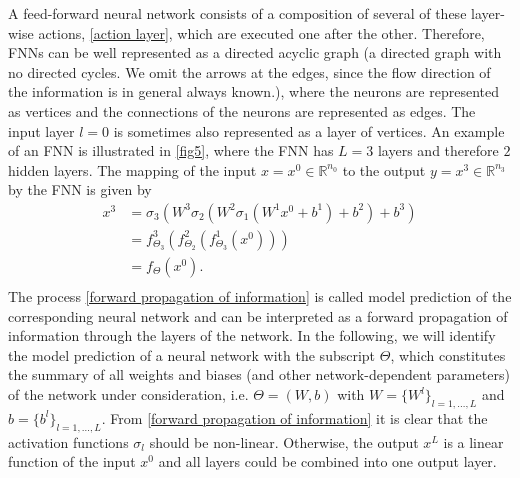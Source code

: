 A feed-forward neural network consists of a composition of several of these layer-wise actions, \cref{action layer}, which are executed one after the other. Therefore, FNNs can be well represented as a directed acyclic graph (a directed graph with no directed cycles. We omit the arrows at the edges, since the flow direction of the information is in general always known.), where the neurons are represented as vertices and the connections of the neurons are represented as edges. The input layer $l=0$ is sometimes also represented as a layer of vertices. An example of an FNN is illustrated in \cref{fig5}, where the FNN has $L=3$ layers and therefore $2$ hidden layers. The mapping of the input $x = x^0 \in \mathbb{R}^{n_0}$ to the output $y = x^3 \in \mathbb{R}^{n_3}$ by the FNN is given by 
\begin{equation}
    \label{forward propagation of information}
    \begin{aligned}
        x^3 &=\sigma_{3} \left( W^{3} \sigma_{2} \left(  W^{2} \sigma_{1} \left( W^{1} x^{0}+b^{1}\right)+b^{2}\right)+b^{3}\right) \\
        & =f^{3}_{\Theta_3} \left( f^{2}_{\Theta_2} \left( f^{1}_{\Theta_3} \left(x^{0} \right) \right) \right) \\
        & = f_{\Theta} \left( x^{0}\right). \\
    \end{aligned}
\end{equation}
The process \cref{forward propagation of information} is called model prediction of the corresponding neural network and can be interpreted as a forward propagation of information through the layers of the network. In the following, we will identify the model prediction of a neural network with the subscript $\Theta$, which constitutes the summary of all weights and biases (and other network-dependent parameters) of the network under consideration, i.e. $\Theta = (W,b)$ with $W = \{ W^l \}_{l = 1, \ldots, L}$ and $b = \{ b^l \}_{l = 1, \ldots, L}$. From \cref{forward propagation of information} it is clear that the activation functions $\sigma_l$ should be non-linear. Otherwise, the output $x^L$ is a linear function of the input $x^0$ and all layers could be combined into one output layer. \\

